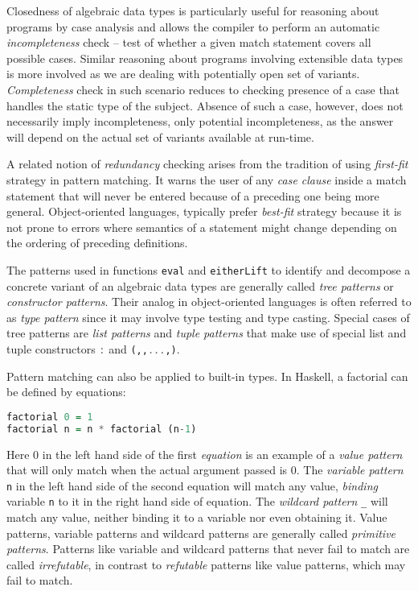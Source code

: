 \documentclass{llncs}
\DeclareRobustCommand{\codehaskell}[1]{{\lstinline[breaklines=false,language=Haskell]{#1}}}
\DeclareRobustCommand{\codeocaml}[1]{{\lstinline[breaklines=false,language=Caml]{#1}}}
\begin{document}
Closedness of algebraic data types is particularly useful for reasoning about 
programs by case analysis and allows the compiler to perform an automatic 
\emph{incompleteness} check -- test of whether a given match statement 
covers all possible cases. Similar reasoning about programs involving extensible 
data types is more involved as we are dealing with potentially open set of 
variants. \emph{Completeness} check in such scenario reduces to checking presence 
of a case that handles the static type of the subject. Absence of such a case,
however, does not necessarily imply incompleteness, only potential incompleteness, 
as the answer will depend on the actual set of variants available at run-time.

A related notion of \emph{redundancy} checking arises from the 
tradition of using \emph{first-fit} strategy in pattern matching. It warns the 
user of any \emph{case clause} inside a match statement that will 
never be entered because of a preceding one being more general. Object-oriented 
languages, typically prefer \emph{best-fit} strategy because it is not prone 
to errors where semantics of a statement might change depending on the ordering 
of preceding definitions. 

The patterns used in functions \codeocaml{eval} and \codehaskell{eitherLift} to 
identify and decompose a concrete variant of an algebraic data types are 
generally called \emph{tree patterns} or \emph{constructor patterns}. Their 
analog in object-oriented languages is often referred to as \emph{type pattern} 
since it may involve type testing and type casting. Special cases of tree patterns  
are \emph{list patterns} and \emph{tuple patterns} that make use of special list 
and tuple constructors \codehaskell{:} and \codehaskell{(,,...,)}.

Pattern matching can also be applied to built-in types.
In Haskell, a factorial can be defined by equations:

\begin{lstlisting}[language=Haskell]
factorial 0 = 1
factorial n = n * factorial (n-1)
\end{lstlisting}

\noindent
Here 0 in the left hand side of the first \emph{equation} is an example of a 
\emph{value pattern} that will only match when the actual argument passed is 0. 
The \emph{variable pattern} \codehaskell{n} in the left hand side of the second 
equation will match any value, \emph{binding} variable \codehaskell{n} to it in 
the right hand side of equation. The \emph{wildcard pattern} \codehaskell{_}  
will match any value, neither binding it to a variable nor even obtaining it. 
Value patterns, variable patterns and wildcard patterns are  
generally called \emph{primitive patterns}. Patterns like variable and wildcard 
patterns that never fail to match are called \emph{irrefutable}, in contrast to 
\emph{refutable} patterns like value patterns, which may fail to match.
\end{document}
